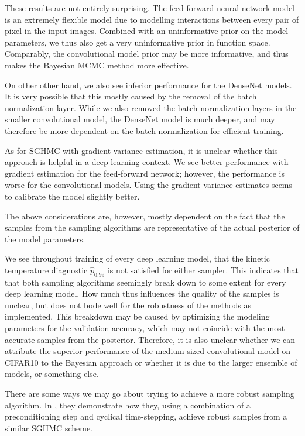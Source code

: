 These results are not entirely surprising.
The feed-forward neural network model is an extremely flexible model due to modelling interactions between every pair of pixel in the input images. 
Combined with an uninformative prior on the model parameters, we thus also get a very uninformative prior in function space.
Comparably, the convolutional model prior may be more informative, and thus makes the Bayesian MCMC method more effective. 

On other other hand, we also see inferior performance for the DenseNet models. 
It is very possible that this mostly caused by the removal of the batch normalization layer. 
While we also removed the batch normalization layers in the smaller convolutional model, the DenseNet model is much deeper, and may therefore be more dependent on the batch normalization for efficient training.

As for SGHMC with gradient variance estimation, it is unclear whether this approach is helpful in a deep learning context. 
We see better performance with gradient estimation for the feed-forward network; however, the performance is worse for the convolutional models.
Using the gradient variance estimates seems to calibrate the model slightly better.

The above considerations are, however, mostly dependent on the fact that the samples from the sampling algorithms are representative of the actual posterior of the model parameters. 

We see throughout training of every deep learning model, that the kinetic temperature diagnostic $\hat{p}_{0.99}$ is not satisfied for either sampler. 
This indicates that that both sampling algorithms seemingly break down to some extent for every deep learning model. 
How much thus influences the quality of the samples is unclear, but does not bode well for the robustness of the methods as implemented.
This breakdown may be caused by optimizing the modeling parameters for the validation accuracy, which may not coincide with the most accurate samples from the posterior. 
Therefore, it is also unclear whether we can attribute the superior performance of the medium-sized convolutional model on CIFAR10 to the Bayesian approach or whether it is due to the larger ensemble of models, or something else.

There are some ways we may go about trying to achieve a more robust sampling algorithm. 
In \autocite{wenzel_how_2020}, they demonstrate how they, using a combination of a preconditioning step and cyclical time-stepping, achieve robust samples from a similar SGHMC scheme.  


